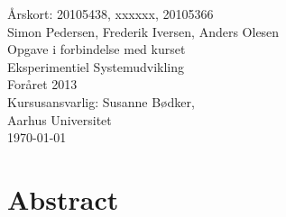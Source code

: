 \documentclass[12pt,a4paper,twoside,danish,article]{memoir}
\begin{document}
\frontmatter
\begin{titlingpage}
  \begin{center}
    \mbox{}\vfill
    \vspace{3cm}
    \Large{Årskort: 20105438, xxxxxx, 20105366}\\
    \Large{Simon Pedersen, Frederik Iversen, Anders Olesen}\\
    \vspace{10cm}
    Opgave i forbindelse med kurset\\ Eksperimentiel Systemudvikling\\
    Foråret 2013\\
    \vspace{1cm}
    Kursusansvarlig: Susanne Bødker,\\Aarhus Universitet\\
    \today
  \end{center}
  \clearpage
  \tableofcontents*
\end{titlingpage}

\mainmatter
\setlength{\parskip}{6pt plus 1pt minus 1pt}
\setlength{\parindent}{0cm}
\renewcommand{\baselinestretch}{1.6}\normalsize %

\renewcommand{\chaptermark}[1]{\markboth{\thechapter.
    #1}{\thechapter. #1}} %
\renewcommand{\bibmark}{\markboth{\bibname}{\bibname}} %
\renewcommand{\tocmark}{\markboth{\contentsname}{\contentsname}}


\chapter{Abstract}












\backmatter
\renewcommand{\baselinestretch}{1}\normalsize %

\end{document}
